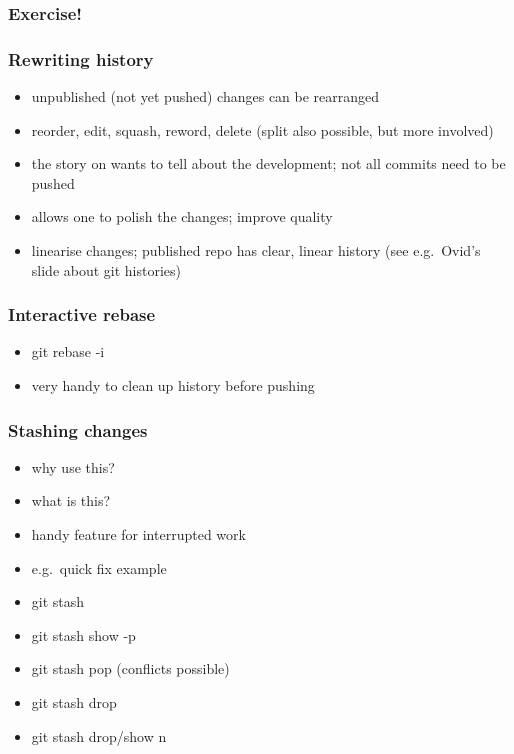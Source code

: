 \documentclass{git_course}
\begin{document}
\begin{frame}
\frametitle{Exercise!}
\end{frame}

\begin{frame}
\frametitle{Rewriting history}
\begin{itemize}
    \item unpublished (not yet pushed) changes can be rearranged
    \item reorder, edit, squash, reword, delete (split also possible,
        but more involved)
    \item the story on wants to tell about the development; not all
        commits need to be pushed
    \item allows one to polish the changes; improve quality
    \item linearise changes; published repo has clear, linear history
        (see e.g.\ Ovid's slide about git histories)
\end{itemize}
\end{frame}

\begin{frame}
\frametitle{Interactive rebase}
\begin{itemize}
    \item git rebase -i
    \item very handy to clean up history before pushing
\end{itemize}
\end{frame}

\begin{frame}
\frametitle{Stashing changes}
\begin{itemize}
    \item why use this?
    \item what is this?
    \item handy feature for interrupted work
    \item e.g.\ quick fix example
    \item git stash
    \item git stash show -p
    \item git stash pop (conflicts possible)
    \item git stash drop
    \item git stash drop/show {n}
\end{itemize}
\end{frame}
\end{document}
